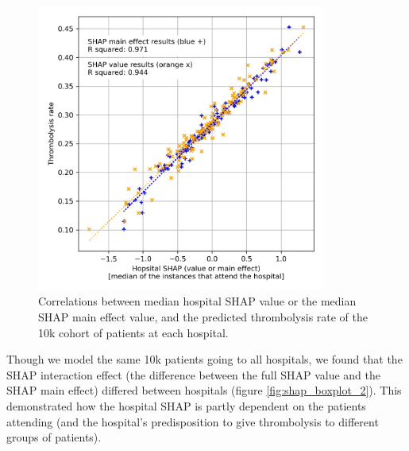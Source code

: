 \begin{figure}
\centering
\includegraphics[width=0.85\textwidth]{./images/04_xgb_10_features_10k_cohort_attended_hosp_shap}
\caption{Correlations between median hospital SHAP value or the median SHAP main effect value, and the predicted thrombolysis rate of the 10k cohort of patients at each hospital.}
\label{fig:shap_correlation_3}
\end{figure}

Though we model the same 10k patients going to all hospitals, we found that the SHAP interaction effect (the difference between the full SHAP value and the SHAP main effect) differed between hospitals (figure \ref{fig:shap_boxplot_2}). This demonstrated how the hospital SHAP is partly dependent on the patients attending (and the hospital's predisposition to give thrombolysis to different groups of patients).

